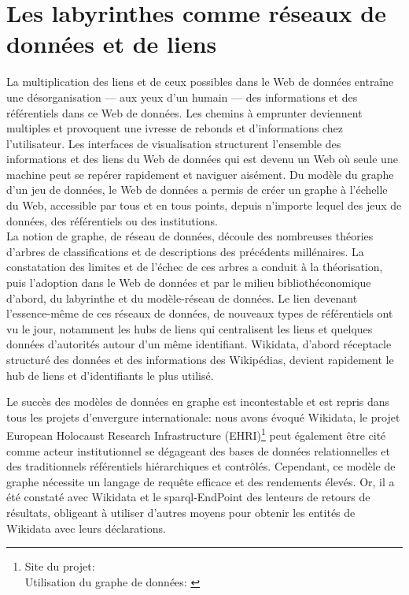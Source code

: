 \chapter{\label{III-A}Les labyrinthes comme réseaux de données et de liens}

La multiplication des liens et de ceux possibles dans le Web de données entraîne une désorganisation --- aux yeux d'un humain --- des informations et des référentiels dans ce Web de données. Les chemins à emprunter deviennent multiples et provoquent une ivresse de rebonds et d'informations chez l'utilisateur. Les interfaces de visualisation structurent l'ensemble des informations et des liens du Web de données qui est devenu un Web où seule une machine peut se repérer rapidement et naviguer aisément. Du modèle du graphe d'un jeu de données, le Web de données a permis de créer un graphe à l'échelle du Web, accessible par tous et en tous points, depuis n'importe lequel des jeux de données, des référentiels ou des institutions.\\

La notion de graphe, de réseau de données, découle des nombreuses théories d'arbres de classifications et de descriptions des précédents millénaires. La constatation des limites et de l'échec de ces arbres a conduit à la théorisation, puis l'adoption dans le Web de données et par le milieu bibliothéconomique d'abord, du labyrinthe et du modèle-réseau de données. Le lien devenant l'essence-même de ces réseaux de données, de nouveaux types de référentiels ont vu le jour, notamment les hubs de liens qui centralisent les liens et quelques données d'autorités autour d'un même identifiant. Wikidata, d'abord réceptacle structuré des données et des informations des Wikipédias, devient rapidement le hub de liens et d'identifiants le plus utilisé.





\bigskip
\bigskip
\bigskip
Le succès des modèles de données en graphe est incontestable et est repris dans tous les projets d'envergure internationale: nous avons évoqué Wikidata, le projet European Holocaust Research Infrastructure (EHRI)\footnote{Site du projet: \cite{noauthor_european_nodate}\\Utilisation du graphe de données: \cite{blanke_developing_2015}} peut également être cité comme acteur institutionnel se dégageant des bases de données relationnelles et des traditionnels référentiels hiérarchiques et contrôlés. Cependant, ce modèle de graphe nécessite un langage de requête efficace et des rendements élevés. Or, il a été constaté avec Wikidata et le \ac{sparql}-EndPoint des lenteurs de retours de résultats, obligeant à utiliser d'autres moyens pour obtenir les entités de Wikidata avec leurs déclarations.\\

